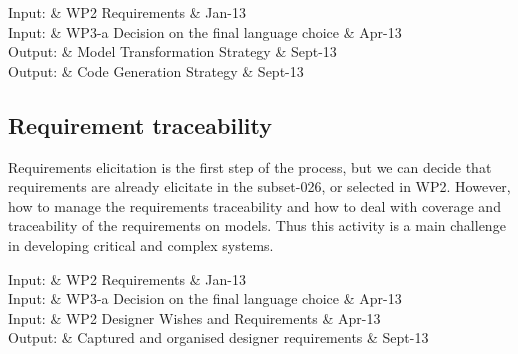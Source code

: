 \documentclass{template/openetcs_article}
\begin{document}
%

\begin{inoutput}
Input: & WP2 Requirements & Jan-13 \\
Input: & WP3-a  Decision on the final language choice & Apr-13 \\
\hline
Output: & Model Transformation Strategy & Sept-13 \\
Output: & Code Generation Strategy & Sept-13 \\
\end{inoutput}


\subsection{Requirement traceability}

Requirements elicitation is the first step of the process, but we can decide that requirements are already elicitate in the subset-026, or selected in WP2. However, how to manage the requirements traceability and how to deal with coverage and traceability of the requirements on models. Thus this activity is a main challenge in developing critical and complex systems.

\begin{inoutput}
Input: & WP2 Requirements & Jan-13 \\
Input: & WP3-a  Decision on the final language choice & Apr-13 \\
Input: & WP2 Designer Wishes and Requirements & Apr-13 \\
\hline
Output: & Captured and organised designer requirements & Sept-13 \\
\end{inoutput}
\end{document}
